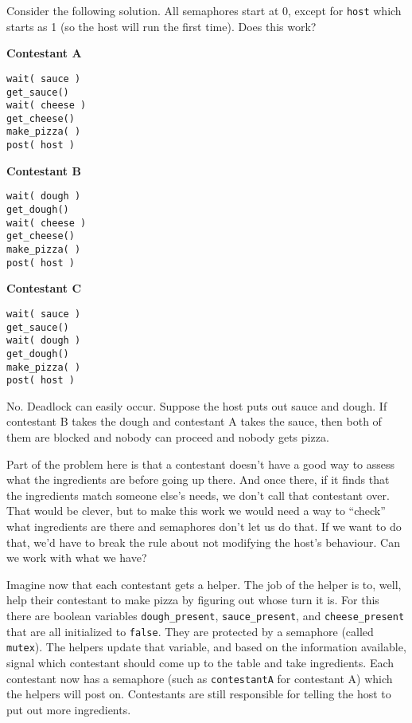 Consider the following solution. All semaphores start at 0, except for \texttt{host} which starts as 1 (so the host will run the first time). Does this work?

\begin{multicols}{3}
	\textbf{Contestant A}
	\begin{lstlisting}
wait( sauce )
get_sauce()
wait( cheese )
get_cheese()
make_pizza( )
post( host )
\end{lstlisting}
	\columnbreak
	\textbf{Contestant B}
	\begin{lstlisting}
wait( dough )
get_dough()
wait( cheese )
get_cheese()
make_pizza( )
post( host )
\end{lstlisting}
	\columnbreak
	\textbf{Contestant C}
	\begin{lstlisting}
wait( sauce )
get_sauce()
wait( dough )
get_dough()
make_pizza( )
post( host )
\end{lstlisting}
\end{multicols}

No. Deadlock can easily occur. Suppose the host puts out sauce and dough. If contestant B takes the dough and contestant A takes the sauce, then both of them are blocked and nobody can proceed and nobody gets pizza.

Part of the problem here is that a contestant doesn't have a good way to assess what the ingredients are before going up there. And once there, if it finds that the ingredients match someone else's needs, we don't call that contestant over. That would be clever, but to make this work we would need a way to ``check'' what ingredients are there and semaphores don't let us do that. If we want to do that, we'd have to break the rule about not modifying the host's behaviour. Can we work with what we have?

Imagine now that each contestant gets a helper. The job of the helper is to, well, help their contestant to make pizza by figuring out whose turn it is. For this there are boolean variables \texttt{dough\_present}, \texttt{sauce\_present}, and \texttt{cheese\_present} that are all initialized to \texttt{false}. They are protected by a semaphore (called \texttt{mutex}). The helpers update that variable, and based on the information available, signal which contestant should come up to the table and take ingredients. Each contestant now has a semaphore (such as \texttt{contestantA} for contestant A) which the helpers will post on. Contestants are still responsible for telling the host to put out more ingredients.

